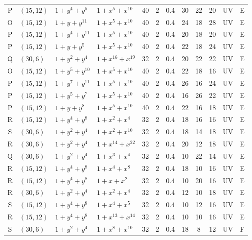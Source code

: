 \begin{table}[t]
\begin{tabular*}{\textwidth}{@{\extracolsep{\fill}}clllcccccclc}
P & $(15,12)$ & $1{+}y^{4}{+}y^{5}$ & $1{+}x^{5}{+}x^{10}$ & 40 & 2 & 0.4 & 30 & 22 & 20 & UV & E \\
O & $(15,12)$ & $1{+}y{+}y^{11}$ & $1{+}x^{5}{+}x^{10}$ & 40 & 2 & 0.4 & 24 & 18 & 28 & UV & E \\
P & $(15,12)$ & $1{+}y^{4}{+}y^{11}$ & $1{+}x^{5}{+}x^{10}$ & 40 & 2 & 0.4 & 20 & 18 & 20 & UV & E \\
P & $(15,12)$ & $1{+}y{+}y^{5}$ & $1{+}x^{5}{+}x^{10}$ & 40 & 2 & 0.4 & 22 & 18 & 24 & UV & E \\
Q & $(30,6)$ & $1{+}y^{2}{+}y^{4}$ & $1{+}x^{16}{+}x^{19}$ & 32 & 2 & 0.4 & 20 & 22 & 22 & UV & E \\
O & $(15,12)$ & $1{+}y^{5}{+}y^{10}$ & $1{+}x^{5}{+}x^{10}$ & 40 & 2 & 0.4 & 22 & 18 & 16 & UV & E \\
P & $(15,12)$ & $1{+}y^{7}{+}y^{11}$ & $1{+}x^{5}{+}x^{10}$ & 40 & 2 & 0.4 & 26 & 16 & 24 & UV & E \\
P & $(15,12)$ & $1{+}y^{5}{+}y^{7}$ & $1{+}x^{5}{+}x^{10}$ & 40 & 2 & 0.4 & 16 & 26 & 22 & UV & E \\
P & $(15,12)$ & $1{+}y{+}y^{8}$ & $1{+}x^{5}{+}x^{10}$ & 40 & 2 & 0.4 & 22 & 16 & 18 & UV & E \\
R & $(15,12)$ & $1{+}y^{4}{+}y^{8}$ & $1{+}x^{2}{+}x^{4}$ & 32 & 2 & 0.4 & 18 & 16 & 16 & UV & E \\
S & $(30,6)$ & $1{+}y^{2}{+}y^{4}$ & $1{+}x^{2}{+}x^{10}$ & 32 & 2 & 0.4 & 18 & 14 & 18 & UV & E \\
R & $(30,6)$ & $1{+}y^{2}{+}y^{4}$ & $1{+}x^{14}{+}x^{22}$ & 32 & 2 & 0.4 & 20 & 12 & 18 & UV & E \\
Q & $(30,6)$ & $1{+}y^{2}{+}y^{4}$ & $1{+}x^{3}{+}x^{4}$ & 32 & 2 & 0.4 & 10 & 22 & 14 & UV & E \\
R & $(15,12)$ & $1{+}y^{4}{+}y^{8}$ & $1{+}x^{4}{+}x^{8}$ & 32 & 2 & 0.4 & 18 & 10 & 16 & UV & E \\
R & $(15,12)$ & $1{+}y^{4}{+}y^{8}$ & $1{+}x{+}x^{2}$ & 32 & 2 & 0.4 & 10 & 20 & 16 & UV & E \\
R & $(30,6)$ & $1{+}y^{2}{+}y^{4}$ & $1{+}x^{2}{+}x^{4}$ & 32 & 2 & 0.4 & 12 & 10 & 18 & UV & E \\
S & $(15,12)$ & $1{+}y^{4}{+}y^{8}$ & $1{+}x^{4}{+}x^{5}$ & 32 & 2 & 0.4 & 10 & 12 & 16 & UV & E \\
R & $(15,12)$ & $1{+}y^{4}{+}y^{8}$ & $1{+}x^{13}{+}x^{14}$ & 32 & 2 & 0.4 & 10 & 10 & 16 & UV & E \\
S & $(30,6)$ & $1{+}y^{2}{+}y^{4}$ & $1{+}x^{8}{+}x^{10}$ & 32 & 2 & 0.4 & 18 & 8 & 12 & UV & F \\

\end{tabular*}
\end{table}
